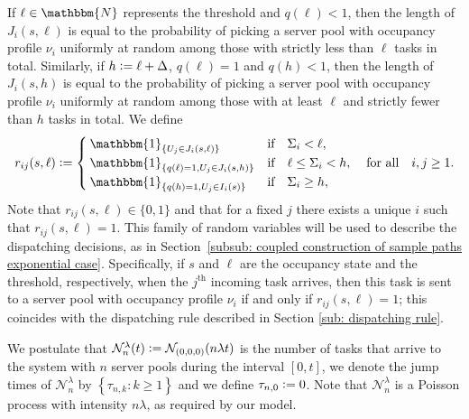 \documentclass[a4paper, 12pt]{article}
\theoremstyle{definition}
\newcommand{\ind}[1]{\mathbbm{1}_{\left\{#1\right\}}}
\newcommand{\set}[2]{\left\{#1 : #2\right\}}
\newcommand{\defeq}{\vcentcolon=}
\newcommand{\calN}{\mathcal{N}}
\newcommand{\N}{\mathbbm{N}}
\begin{document}
If $\ell \in \N$ represents the threshold and $q(\ell) < 1$, then the length of $J_i(s, \ell)$ is equal to the probability of picking a server pool with occupancy profile $\nu_i$ uniformly at random among those with strictly less than $\ell$ tasks in total. Similarly, if $h \defeq \ell + \Delta$, $q(\ell) = 1$ and  $q(h) < 1$, then the length of $J_i(s, h)$ is equal to the probability of picking a server pool with occupancy profile $\nu_i$ uniformly at random among those with at least $\ell$ and strictly fewer than $h$ tasks in total. We define
\begin{equation*}
	r_{ij}(s, \ell) \defeq \begin{cases}
		\ind{U_j \in J_i(s, \ell)} & \text{if} \quad \Sigma_i < \ell, \\
		\ind{q(\ell) = 1, U_j \in J_i(s, h)} & \text{if} \quad \ell \leq \Sigma_i < h, \\
		\ind{q(h) = 1, U_j \in I_i(s)} & \text{if} \quad \Sigma_i \geq h,
	\end{cases}
	\quad \text{for all} \quad i,j \geq 1.
\end{equation*}
Note that $r_{ij}(s, \ell) \in \{0, 1\}$ and that for a fixed $j$ there exists a unique $i$ such that $r_{ij}(s, \ell) = 1$. This family of random variables will be used to describe the dispatching decisions, as in Section~\ref{subsub: coupled construction of sample paths exponential case}. Specifically, if $s$ and $\ell$ are the occupancy state and the threshold, respectively, when the $j^{\text{th}}$ incoming task arrives, then this task is sent to a server pool with occupancy profile $\nu_i$ if and only if $r_{ij}(s, \ell) = 1$; this coincides with the dispatching rule described in Section \ref{sub: dispatching rule}.

We postulate that $\calN_n^\lambda(t) \defeq \calN_{(0, 0, 0)}(n\lambda t)$ is the number of tasks that arrive to the system with $n$ server pools during the interval $[0, t]$, we denote the jump times of $\calN_n^\lambda$ by $\set{\tau_{n,k}}{k \geq 1}$ and we define $\tau_{n,0} \defeq 0$. Note that $\calN_n^\lambda$ is a Poisson process with intensity $n\lambda$, as required by our model.
\end{document}
